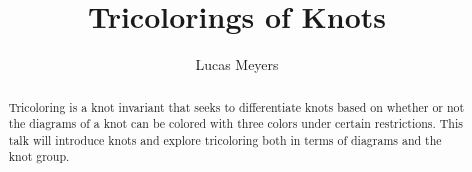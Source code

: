 \documentclass[12pt]{amsart}
\begin{document}
\title{Tricolorings of Knots}

\author{Lucas Meyers}

\address{Mathematics Department\\Louisiana State University\\Baton Rouge, Louisiana}


\begin{abstract}




Tricoloring is a knot invariant that seeks to differentiate knots based on
whether or not the diagrams of a knot can be colored with three colors
under certain restrictions. This talk will introduce knots and
explore tricoloring both in terms of diagrams and the knot group.
\end{abstract}

\maketitle
\end{document}
